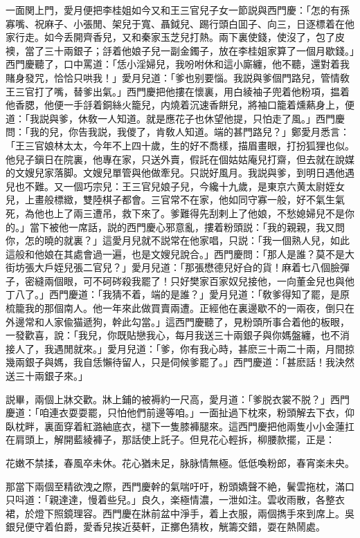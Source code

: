 一面関上門，愛月便把李桂姐如今又和王三官兒子女一節説與西門慶：「怎的有孫寡嘴、祝麻子、小張閒、架兒于寬、聶鉞兒、踢行頭白囬子、向三，日逐標着在他家行走。如今丢開齊香兒，又和秦家玉芝兒打熱。兩下裏使錢，使沒了，包了皮襖，當了三十兩銀子；㧱着他娘子兒一副金鐲子，放在李桂姐家算了一個月歇錢。」西門慶聽了，口中罵道：「恁小淫婦兒，我吩咐休和這小廝纏，他不聽，還對着我賭身發咒，恰恰只哄我！」愛月兒道：「爹也别要惱。我説與爹個門路兒，管情敎王三官打了嘴，替爹出氣。」西門慶把他摟在懷裏，用白綾袖子兜着他粉項，揾着他香腮，他便一手㧱着銅絲火籠兒，内燒着沉速香餅兒，將袖口籠着燻爇身上，便道：「我説與爹，休敎一人知道。就是應花子也休望他提，只怕走了風。」西門慶問：「我的兒，你告我説，我儍了，肯敎人知道。端的甚門路兒？」鄭愛月悉言：「王三官娘林太太，今年不上四十歲，生的好不喬樣，描眉畫眼，打扮狐狸也似。他兒子鎭日在院裏，他專在家，只送外賣，假託在個姑姑庵兒打齋，但去就在說媒的文嫂兒家落脚。文嫂兒單管與他做牽兒。只説好風月。我説與爹，到明日遇他遇兒也不難。又一個巧宗兒：王三官兒娘子兒，今纔十九歲，是東京六黄太尉姪女兒，上畫般標緻，雙陸棋子都會。三官常不在家，他如同守寡一般，好不氣生氣死，為他也上了兩三遭吊，救下來了。爹難得先刮剌上了他娘，不愁媳婦兒不是你的。」當下被他一席話，説的西門慶心邪意亂，摟着粉頭説：「我的親親，我又問你，怎的曉的就裏？」這愛月兒就不説常在他家唱，只説：「我一個熟人兒，如此這般和他娘在其處會過一遍，也是文嫂兒說合。」西門慶問：「那人是誰？莫不是大街坊張大戶姪兒張二官兒？」愛月兒道：「那張懋德兒好㒲的貨！麻着七八個臉彈子，密縫兩個眼，可不砢硶殺我罷了！只好樊家百家奴兒接他，一向董金兒也與他丁八了。」西門慶道：「我猜不着，端的是誰？」愛月兒道：「敎爹得知了罷，是原梳籠我的那個南人。他一年來此做買賣兩遭。正經他在裏邊歇不的一兩夜，倒只在外邊常和人家偸猫遞狗，幹此勾當。」這西門慶聽了，見粉頭所事合着他的板眼，一發歡喜，說：「我兒，你既貼戀我心，每月我送三十兩銀子與你媽盤纏，也不消接人了，我遇閒就來。」愛月兒道：「爹，你有我心時，甚麽三十兩二十兩，月間掠幾兩銀子與媽，我自恁懶待留人，只是伺候爹罷了。」西門慶道：「甚麽話！我決然送三十兩銀子來。」

説畢，兩個上牀交歡。牀上鋪的被褥約一尺高，愛月道：「爹脱衣裳不脱？」西門慶道：「咱連衣耍耍罷，只怕他們前邊等咱。」一面扯過下枕來，粉頭解去下衣，仰臥枕畔，裏面穿着紅潞紬底衣，褪下一隻膝褲腿來。這西門慶把他兩隻小小金蓮扛在肩頭上，解開藍綾褲子，那話使上託子。但見花心輕拆，柳腰款擺，正是：

\begin{myquote}
花嫩不禁揉，春風卒未休。花心猶未足，脉脉情無極。低低喚粉郎，春宵楽未央。
\end{myquote}

那當下兩個至精欲洩之際，西門慶幹的氣喘吁吁，粉頭嬌聲不絶，鬢雲拖枕，滿口只呌道：「親達達，慢着些兒。」良久，楽極情濃，一泄如注。雲收雨散，各整衣裙，於燈下照鏡理容。西門慶在牀前盆中淨手，着上衣服，兩個擕手來到席上。吳銀兒便守着伯爵，愛香兒挨近葵軒，正擲色猜枚，觥籌交錯，耍在熱鬧處。

